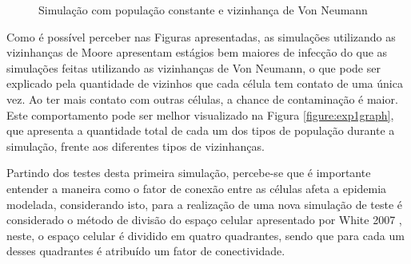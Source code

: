 \documentclass[a4paper,12pt]{article}
\begin{document}
\begin{figure}[!ht]
\qquad
{}
\qquad
{}
\caption{Simulação com população constante e vizinhança de Von Neumann}
\label{figure:exp1vonneumann}
\end{figure}

Como é possível perceber nas Figuras apresentadas, as simulações utilizando as vizinhanças de Moore apresentam estágios bem maiores de infecção do que as simulações feitas utilizando as vizinhanças de Von Neumann, o que pode ser explicado pela quantidade de vizinhos que cada célula tem contato de uma única vez. Ao ter mais contato com outras células, a chance de contaminação é maior. Este comportamento pode ser melhor visualizado na Figura \ref{figure:exp1graph}, que apresenta a quantidade total de cada um dos tipos de população durante a simulação, frente aos diferentes tipos de vizinhanças.

\newpage

Partindo dos testes desta primeira simulação, percebe-se que é importante entender a maneira como o fator de conexão entre as células afeta a epidemia modelada, considerando isto, para a realização de uma nova simulação de teste é considerado o método de divisão do espaço celular apresentado por White 2007 \cite{White2007}, neste, o espaço celular é dividido em quatro quadrantes, sendo que para cada um desses quadrantes é atribuído um fator de conectividade.
\end{document}
